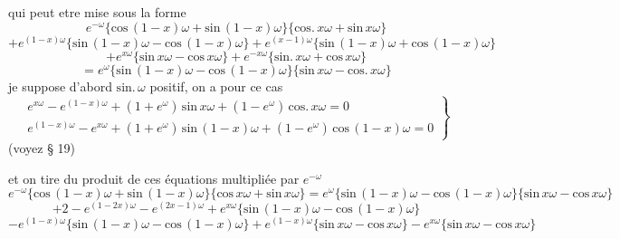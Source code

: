 \documentclass[11pt,a4paper]{article}
\begin{document}
qui peut etre mise sous la forme
\[ e^{-\omega}\{\text{cos}\,(1-x)\omega + \text{sin}\,(1-x)\omega\}\{\text{cos}.\,x\omega + \text{sin}\,x\omega\} \]
\[ + e^{(1-x)\omega}\{\text{sin}\,(1-x)\omega - \text{cos}\,(1-x)\omega\} + e^{(x-1)\omega}\{\text{sin}\,(1-x)\omega + \text{cos}\,(1-x)\omega\} \]
\[ + e^{x\omega}\{\text{sin}\,x\omega - \text{cos}\,x\omega\} + e^{-x\omega}\{\text{sin}.\,x\omega + \text{cos}\,x\omega\} \]
\[ = e^{\omega}\{\text{sin}\,(1-x)\omega - \text{cos}\,(1-x)\omega\}\{\text{sin}\,x\omega - \text{cos}.\,x\omega\} \]
je suppose d'abord $\text{sin}.\,\omega$ positif, on a pour ce cas
\[ \left.\begin{array}{l} e^{x\omega} - e^{(1-x)\omega} + (1 + e^{\omega})\,\text{sin}\,x\omega + (1 - e^{\omega})\,\text{cos}.\,x\omega = 0 \\ e^{(1-x)\omega} - e^{x\omega} + (1 + e^{\omega})\,\text{sin}\,(1-x)\omega + (1 - e^{\omega})\,\text{cos}\,(1-x)\omega = 0 \end{array}\right\} \]
(voyez § 19)

et on tire du produit de ces équations multipliée par $e^{-\omega}$
\[ e^{-\omega}\{\text{cos}\,(1-x)\omega + \text{sin}\,(1-x)\omega\}\{\text{cos}\,x\omega + \text{sin}\,x\omega\} = e^{\omega}\{\text{sin}\,(1-x)\omega - \text{cos}\,(1-x)\omega\}\{\text{sin}\,x\omega - \text{cos}\,x\omega\} \]
\[ + 2 - e^{(1-2x)\omega} - e^{(2x-1)\omega} + e^{x\omega}\{\text{sin}\,(1-x)\omega - \text{cos}\,(1-x)\omega\} \]
\[ - e^{(1-x)\omega}\{\text{sin}\,(1-x)\omega - \text{cos}\,(1-x)\omega\} + e^{(1-x)\omega}\{\text{sin}\,x\omega - \text{cos}\,x\omega\} - e^{x\omega}\{\text{sin}\,x\omega - \text{cos}\,x\omega\} \]

\end{document}
